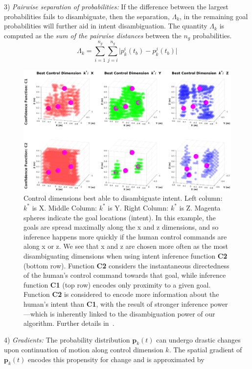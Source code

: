 3) \textit{Pairwise separation of probabilities:} If the difference between the largest probabilities fails to disambiguate, then the separation, $\Lambda_k$, in the remaining goal probabilities will further aid in intent disambiguation. The quantity $\Lambda_k$ is computed as the \textit{sum of the pairwise distances} between the $n_g$ probabilities.
\begin{equation}
\Lambda_k = \sum_{i=1}^{n_g}\sum_{j=i}^{n_g}\lvert p^i_k(t_b) - p^j_k(t_b)\rvert
\end{equation}
\begin{figure}[t]
	\centering
	\includegraphics[width = 1.15\hsize, height = 0.45\vsize, center]{./figures/sim_res.eps}
	\caption{Control dimensions best able to disambiguate intent.  Left column: $k^*$ is X. Middle Column: $k^*$ is Y. Right Column: $k^*$ is Z. Magenta spheres indicate the goal locations (intent). In this example, the goals are spread maximally along the x and z dimensions, and so inference happens more quickly if the human control commands are along x or z. We see that x and z are chosen more often as the most disambiguating dimensions when using intent inference function \textbf{C2} (bottom row). Function \textbf{C2} considers the instantaneous directedness of the human's control command towards that goal, while inference function \textbf{C1} (top row) encodes only proximity to a given goal. Function \textbf{C2} is considered to encode more information about the human's intent than \textbf{C1}, with the result of stronger inference power---which is inherently linked to the disambiguation power of our algorithm. Further details in~\cite{gopinath2017mode}.}
	\label{fig:sim_res}
\end{figure}
4) \textit{Gradients:} The probability distribution $\boldsymbol{p}_k(t)$ can undergo drastic changes upon continuation of motion along control dimension $k$. The spatial gradient of $\boldsymbol{p}_k(t)$ encodes this propensity for change and is approximated by 
